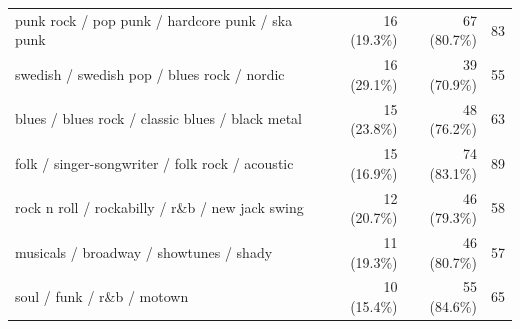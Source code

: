 \begin{table}[t]
\begin{tabular*}{\linewidth}{@{\extracolsep{\fill}}lrrr}
punk rock / pop punk / hardcore punk / ska punk & 16 (19.3\%) & 67 (80.7\%) & 83 \\ 
swedish / swedish pop / blues rock / nordic & 16 (29.1\%) & 39 (70.9\%) & 55 \\ 
blues / blues rock / classic blues / black metal & 15 (23.8\%) & 48 (76.2\%) & 63 \\ 
folk / singer-songwriter / folk rock / acoustic & 15 (16.9\%) & 74 (83.1\%) & 89 \\ 
rock n roll / rockabilly / r\&b / new jack swing & 12 (20.7\%) & 46 (79.3\%) & 58 \\ 
musicals / broadway / showtunes / shady & 11 (19.3\%) & 46 (80.7\%) & 57 \\ 
soul / funk / r\&b / motown & 10 (15.4\%) & 55 (84.6\%) & 65 \\ 
\bottomrule
\end{tabular*}
\end{table}

